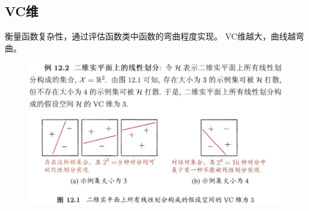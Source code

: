 \subsection{VC维}
衡量函数复杂性，通过评估函数类中函数的弯曲程度实现。
VC维越大，曲线越弯曲。
\begin{figure}[H]
\centering
\includegraphics[width=0.6\linewidth]{fig/vc_dimension.png}
\end{figure}